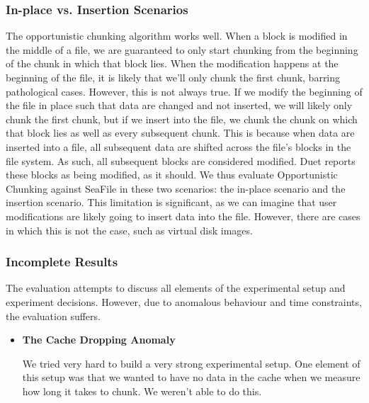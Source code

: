 \documentclass[table]{article}
\begin{document}
\begin{multicols}{2}
\subsubsection{In-place vs. Insertion Scenarios}
The opportunistic chunking algorithm works well. When a block is modified in the middle of a file, we are guaranteed to only start chunking from the beginning of the chunk in which that block lies. When the modification happens at the beginning of the file, it is likely that we'll only chunk the first chunk, barring pathological cases. However, this is not always true. If we modify the beginning of the file in place such that data are changed and not inserted, we will likely only chunk the first chunk, but if we insert into the file, we chunk the chunk on which that block lies as well as every subsequent chunk. This is because when data are inserted into a file, all subsequent data are shifted across the file's blocks in the file system. As such, all subsequent blocks are considered modified. Duet reports these blocks as being modified, as it should. We thus evaluate Opportunistic Chunking against SeaFile in these two scenarios: the in-place scenario and the insertion scenario. This limitation is significant, as we can imagine that user modifications are likely going to insert data into the file. However, there are cases in which this is not the case, such as virtual disk images. %

\subsubsection{Incomplete Results}

        The evaluation attempts to discuss all elements of the experimental setup and experiment decisions. However, due to anomalous behaviour and time constraints, the evaluation suffers.

\begin{itemize}
\item \textbf{The Cache Dropping Anomaly}

        We tried very hard to build a very strong experimental setup. One element of this setup was that we wanted to have no data in the cache when we measure how long it takes to chunk. We weren't able to do this.
        

\end{itemize}
\end{multicols}
\end{document}
